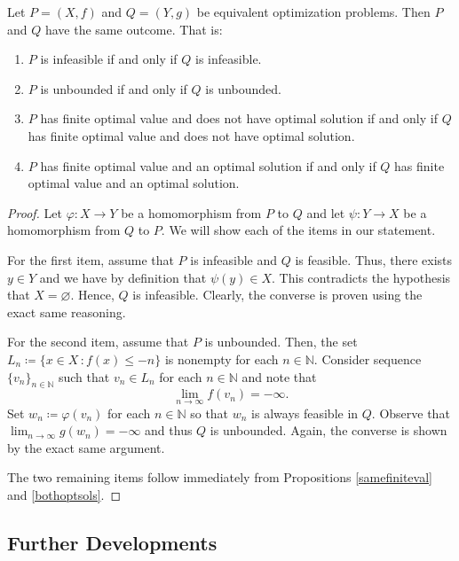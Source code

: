 \documentclass[a4paper]{article}
\begin{document}
\begin{lemma}
Let \(P=(X,f)\) and \(Q=(Y,g)\) be equivalent optimization problems. Then \(P\)
and \(Q\) have the same outcome. That is:
\begin{enumerate}[label=(\roman*)]
\item \(P\) is infeasible if and only if \(Q\) is infeasible.
\item \(P\) is unbounded if and only if \(Q\) is unbounded.
\item \(P\) has finite optimal value and does not have optimal solution if and
    only if \(Q\) has finite optimal value and does not have optimal solution.
\item \(P\) has finite optimal value and an optimal solution if and only if
  \(Q\) has finite optimal value and an optimal solution.   
 \end{enumerate}
\end{lemma}
\begin{proof}
 Let \(\varphi\colon X\to Y\) be a homomorphism from \(P\) to \(Q\) and let
 \(\psi\colon Y \to X\) be a homomorphism from \(Q\) to \(P\). We will show each
 of the items in our statement.
 
 For the first item, assume that \(P\) is infeasible and \(Q\) is feasible. Thus, there exists
  \(y\in Y\) and we have by definition that \(\psi(y)\in X\). This contradicts
  the hypothesis  that \(X=\varnothing\). Hence, \(Q\) is infeasible. Clearly,
  the converse is proven using the exact same reasoning.
  
 For the second item, assume that \(P\) is unbounded. Then, the set \mbox{\(L_n\coloneqq\{x\in
   X\,\colon f(x)\leq -n\}\)} is nonempty for each \(n\in\mathbb{N}\). Consider
   sequence \(\{v_n\}_{n\in\mathbb{N}}\) such that \(v_n\in L_n\) for each
   \(n\in\mathbb{N}\) and note that \[\lim_{n\rightarrow\infty}f(v_n)=-\infty.\]
   Set \(w_n\coloneqq \varphi(v_n)\) for each \(n\in\mathbb{N}\) so that \(w_n\) is
   always feasible in \(Q\). Observe that 
   \(\lim_{n\rightarrow\infty}g(w_n)=-\infty\) and thus \(Q\) is unbounded.
   Again, the converse is shown by the exact same argument.
   
   The two remaining items follow immediately from Propositions
   \ref{samefiniteval} and \ref{bothoptsols}.\qedhere

   \end{proof}
\subsection*{Further Developments}
\end{document}
